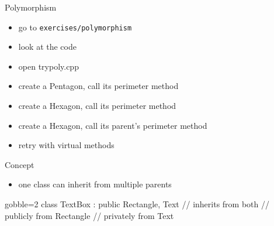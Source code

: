 \begin{frame}[fragile]
  \begin{exercise}{Polymorphism}
    \begin{itemize}
    \item go to \texttt{exercises/polymorphism}
    \item look at the code
    \item open trypoly.cpp
    \item create a Pentagon, call its perimeter method
    \item create a Hexagon, call its perimeter method
    \item create a Hexagon, call its parent's perimeter method
    \item retry with virtual methods
    \end{itemize}
  \end{exercise}
\end{frame}

\begin{frame}[fragile]
  \begin{block}{Concept}
    \begin{itemize}
    \item one class can inherit from multiple parents
    \end{itemize}
  \end{block}
  \begin{multicols}{2}
    \columnbreak
    \vspace{2cm}
    \begin{cppcode*}{gobble=2}
      class TextBox :
        public Rectangle, Text {
        // inherits from both
        // publicly from Rectangle
        // privately from Text
      }
    \end{cppcode*}
  \end{multicols}
\end{frame}

